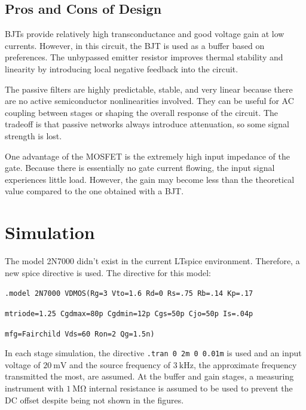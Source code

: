 \documentclass[12pt, a4paper]{article}
\numberwithin{table}{section}
\numberwithin{figure}{section}
\begin{document}
\subsection{Pros and Cons of Design}

BJTs provide relatively high transconductance and good voltage gain at low currents. However, in this circuit, the BJT is used as a buffer  based on preferences. The unbypassed emitter resistor improves thermal stability and linearity by introducing local negative feedback into the circuit.

The passive filters are highly predictable, stable, and very linear because there are no active semiconductor nonlinearities involved. They can be useful for AC coupling between stages or shaping the overall response of the circuit. The tradeoff is that passive networks always introduce attenuation, so some signal strength is lost.

One advantage of the MOSFET is the extremely high input impedance of the gate. Because there is essentially no gate current flowing, the input signal experiences little load. However, the gain may become less than the theoretical value compared to the one obtained with a BJT.

\section{Simulation}

The model 2N7000 didn't exist in the current LTspice environment. Therefore, a new spice directive \cite{4} is used. The directive for this model:

\texttt{.model 2N7000 VDMOS(Rg=3 Vto=1.6 Rd=0 Rs=.75 Rb=.14 Kp=.17}

\vspace{-1em}

\texttt{mtriode=1.25 Cgdmax=80p Cgdmin=12p Cgs=50p Cjo=50p Is=.04p}

\vspace{-1em}

\texttt{mfg=Fairchild Vds=60 Ron=2 Qg=1.5n)}

In each stage simulation, the directive \verb|.tran 0 2m 0 0.01m| is used and an input voltage of $20~\mathrm{mV}$ and the source frequency of $3~\mathrm{kHz}$, the approximate frequency transmitted the most, are assumed. At the buffer and gain stages, a measuring instrument with $1~\mathrm{M\Omega}$ internal resistance is assumed to be used to prevent the DC offset despite being not shown in the figures.
\end{document}
